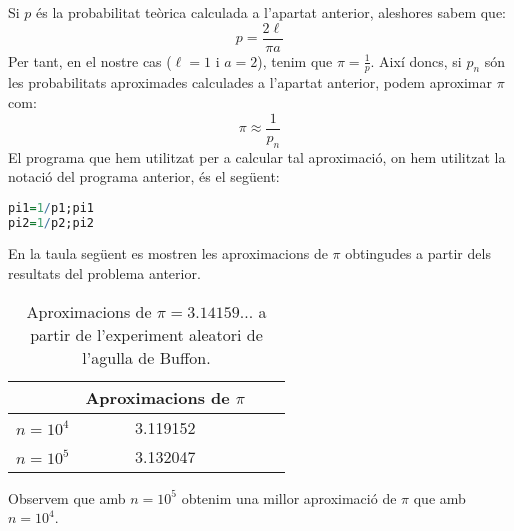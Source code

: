 \documentclass[11pt,a4paper]{article}
\begin{document}
Si $p$ és la probabilitat teòrica calculada a l'apartat anterior, aleshores sabem que: $$p=\frac{2\ell}{\pi a}$$
Per tant, en el nostre cas ($\ell=1$ i $a=2$), tenim que $\pi=\frac{1}{p}$. Així doncs, si $p_n$ són les probabilitats aproximades calculades a l'apartat anterior, podem aproximar $\pi$ com: $$\pi\approx \frac{1}{p_n}$$
El programa que hem utilitzat per a calcular tal aproximació, on hem utilitzat la notació del programa anterior, és el següent:
\begin{lstlisting}[language=R, caption={Programa del problema 5},xleftmargin=.3\textwidth,xrightmargin=.3\textwidth]
pi1=1/p1;pi1
pi2=1/p2;pi2
\end{lstlisting}
En la taula següent es mostren les aproximacions de $\pi$ obtingudes a partir dels resultats del problema anterior.
\begin{table}[ht]
  \centering
  \begin{tabular}{|c|c|c|c|}
    \hline
             & Aproximacions de $\pi$ \\
    \hline
    $n=10^4$ & 3.119152               \\
    \hline
    $n=10^5$ & 3.132047               \\
    \hline
  \end{tabular}
  \caption{Aproximacions de $\pi=3.14159...$ a partir de l'experiment aleatori de l'agulla de Buffon.}
\end{table}

Observem que amb $n=10^5$ obtenim una millor aproximació de $\pi$ que amb $n=10^4$.
\end{document}
